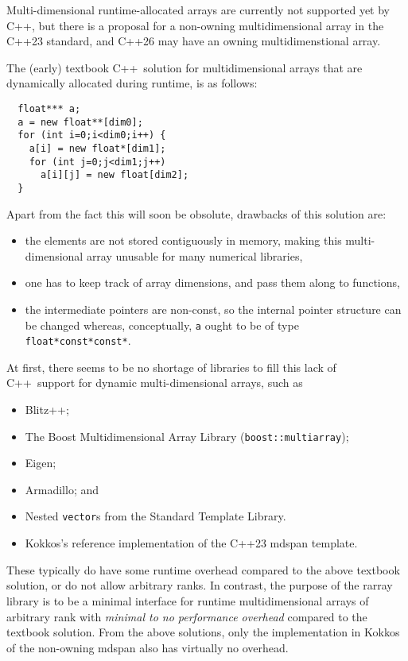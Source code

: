 \documentclass[11pt,twoside]{article}
\newcommand{\cxx}{C{++}}
\begin{document}
Multi-dimensional runtime-allocated arrays are currently not supported yet by
\cxx, but there is a proposal for a non-owning multidimensional array in
the C++23 standard, and C++26 may have an owning multidimenstional
array.

The (early) textbook \cxx\ solution for multidimensional arrays that are
dynamically allocated during runtime, is as follows:
\vspace{-5pt}\begin{framed}\vspace{-14pt}%
\begin{verbatim}
  float*** a;
  a = new float**[dim0];
  for (int i=0;i<dim0;i++) {
    a[i] = new float*[dim1];
    for (int j=0;j<dim1;j++) 
      a[i][j] = new float[dim2];
  }
\end{verbatim}%
\vspace{-12pt}\end{framed}\vspace{-5pt}%
Apart from the fact this will soon be obsolute, drawbacks of this solution are:
\begin{itemize}
  \item the elements are not stored contiguously in memory, making
    this multi-dimensional array unusable
    for many numerical libraries,
  \item one has to keep track of array dimensions, and pass them along
    to functions,
  \item the intermediate pointers are non-const, so the
    internal pointer structure can be changed
    whereas, conceptually, \texttt{a} ought to be of type \texttt{float*const*const*}.
\end{itemize}
At first, there seems to be no shortage of libraries to fill this
lack of \cxx\ support for dynamic multi-dimensional arrays, such as
\begin{itemize}\itemsep 0pt \parskip 0pt
\item Blitz++;
\item The Boost Multidimensional Array Library (\texttt{boost::multiarray}); 
\item Eigen;
\item Armadillo; and
\item Nested \texttt{vector}s from the Standard Template Library.
\item Kokkos's reference implementation of the C++23 mdspan template.
\end{itemize}
These typically do have some runtime overhead compared to the above
textbook solution, or do not allow arbitrary ranks. In contrast, the purpose of the rarray
library is to be a minimal interface for runtime multidimensional
arrays of
arbitrary rank with
\emph{minimal to no performance overhead} compared to the textbook
solution.  From the above solutions, only the  implementation in
Kokkos of the non-owning mdspan also has virtually no overhead.
\end{document}
